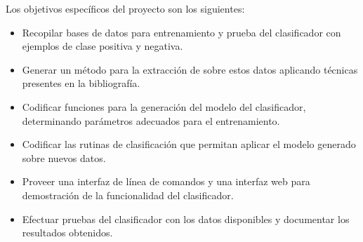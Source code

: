 %

Los objetivos específicos del proyecto son los siguientes:
%
\begin{itemize}
\item Recopilar bases de datos para entrenamiento y prueba del
  clasificador con ejemplos de clase positiva y negativa.
\item Generar un método para la extracción de  sobre
  estos datos aplicando técnicas presentes en la bibliografía.
\item Codificar funciones para la generación del modelo del
  clasificador, determinando parámetros adecuados para el
  entrenamiento.
\item Codificar las rutinas de clasificación que permitan aplicar el
  modelo generado sobre nuevos datos.
\item Proveer una interfaz de línea de comandos y una interfaz web
  para demostración de la funcionalidad del clasificador.
\item Efectuar pruebas del clasificador con los datos disponibles y
  documentar los resultados obtenidos.
\end{itemize}
%
